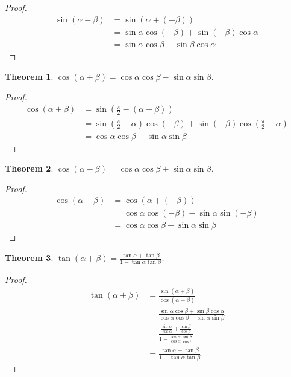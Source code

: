 \documentclass[12pt]{article}
\newtheorem*{theorem}{Theorem}
\begin{document}
    \begin{proof}
        \begin{align*}
            \sin(\alpha-\beta)&=\sin(\alpha+(-\beta))\\&=\sin{\alpha}\cos(-\beta)+\sin(-\beta)\cos{\alpha}\\&=\sin{\alpha}\cos{\beta}-\sin{\beta}\cos{\alpha}
        \end{align*}
    \end{proof}

    \begin{theorem}
        $\cos(\alpha+\beta)=\cos{\alpha}\cos{\beta}-\sin{\alpha}\sin{\beta}$.
    \end{theorem}

    \begin{proof}
        \begin{align*}
            \cos(\alpha+\beta)&=\sin(\frac{\pi}{2}-(\alpha+\beta))\\&=\sin(\frac{\pi}{2}-\alpha)\cos(-\beta)+\sin(-\beta)\cos(\frac{\pi}{2}-\alpha)\\&=\cos{\alpha}\cos{\beta}-\sin{\alpha}\sin{\beta}
        \end{align*}
    \end{proof}

    \begin{theorem}
        $\cos(\alpha-\beta)=\cos{\alpha}\cos{\beta}+\sin{\alpha}\sin{\beta}$.
    \end{theorem}

    \begin{proof}
        \begin{align*}
            \cos(\alpha-\beta)&=\cos(\alpha+(-\beta))\\&=\cos{\alpha}\cos(-\beta)-\sin{\alpha}\sin(-\beta)\\&=\cos{\alpha}\cos{\beta}+\sin{\alpha}\sin{\beta}
        \end{align*}
    \end{proof}

    \begin{theorem}
        $\tan(\alpha+\beta)=\frac{\tan{\alpha}+\tan{\beta}}{1-\tan{\alpha}\tan{\beta}}$.
    \end{theorem}

    \begin{proof}
        \begin{align*}
            \tan(\alpha+\beta)&=\frac{\sin(\alpha+\beta)}{\cos(\alpha+\beta)}\\&=\frac{\sin{\alpha}\cos{\beta}+\sin{\beta}\cos{\alpha}}{\cos{\alpha}\cos{\beta}-\sin{\alpha}\sin{\beta}}\\&=\frac{\frac{\sin{\alpha}}{\cos{\alpha}}+\frac{\sin{\beta}}{\cos{\beta}}}{1-\frac{\sin{\alpha}}{\cos{\alpha}}\frac{\sin{\beta}}{\cos{\beta}}}\\&=\frac{\tan{\alpha}+\tan{\beta}}{1-\tan{\alpha}\tan{\beta}}
        \end{align*}
    \end{proof}
\end{document}
